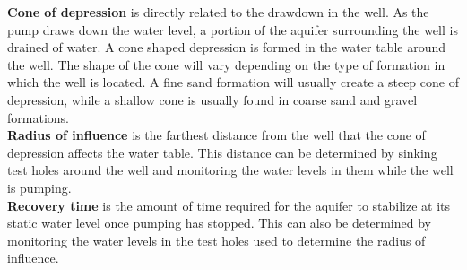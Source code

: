 \vspace{0.3cm}
\textbf{Cone of depression} is directly related to the drawdown in the well. As the pump draws down the water level, a portion of the aquifer surrounding the well is drained of water. A cone shaped depression is formed in the water table around the well. The shape of the cone will vary depending on the type of formation in which the well is located. A fine sand formation will usually create a steep cone of depression, while a shallow cone is usually found in coarse sand and gravel formations.\\
\vspace{0.3cm}
\textbf{Radius of influence} is the farthest distance from the well that the cone of depression affects the water table. This distance can be determined by sinking test holes around the well and monitoring the water levels in them while the well is pumping.\\
\vspace{0.3cm}
\textbf{Recovery time} is the amount of time required for the aquifer to stabilize at its static water level once pumping has stopped. This can also be determined by monitoring the water levels in the test holes used to determine the radius of influence.\\

